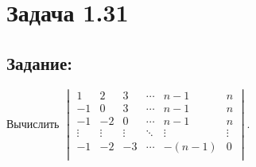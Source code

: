 \section{Задача 1.31}
\subsection{Задание:}
Вычислить
$
	\begin{vmatrix}
		1 & 2 & 3 & \cdots & n - 1 & n \\
		-1 & 0 & 3 & \cdots & n - 1 &  n \\
		-1 & -2 & 0 & \cdots & n - 1 & n \\
		\vdots & \vdots & \vdots & \ddots & \vdots & \vdots \\
		-1 & -2 & -3 & \cdots & -(n - 1) & 0 \\
	\end{vmatrix}
$.
